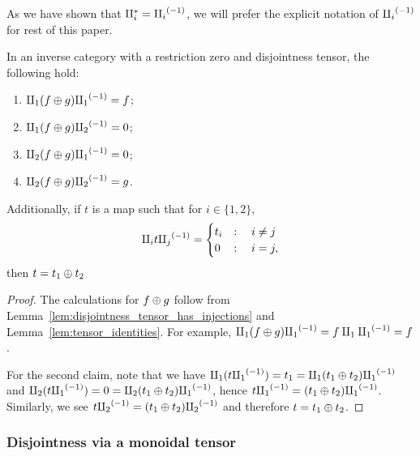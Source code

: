 As we have shown that $\amalg_{i}^{*} = {\amalg_{i}}^{(-1)}$, we will prefer the explicit notation of ${\amalg_{i}}^{(-1)}$ for
rest of this paper.

\begin{corollary}\label{cor:split_plus_tensor}
  In an inverse category \X with a restriction zero and disjointness tensor, the following hold:
  \begin{multicols}{2}
    \begin{enumerate}[{(}i{)}]
      \item $\amalg_{1} (f \oplus g) {\amalg_{1}}^{(-1)} = f$;
      \item $\amalg_{1} (f\oplus g) {\amalg_{2}}^{(-1)} = 0$;
      \item $\amalg_{2} (f \oplus g) {\amalg_{1}}^{(-1)} = 0$;
      \item $\amalg_{2} (f\oplus g) {\amalg_{2}}^{(-1)} = g$.
    \end{enumerate}
  \end{multicols}
  Additionally, if $t$ is a map such that for $i \in \{1,2\}$,
  \[
    \amalg_{i} t {\amalg_{j}}^{(-1)} =
    \begin{cases}
      t_i& : \quad i \neq j\\
      0 & : \quad i = j,
    \end{cases}
  \]
  then $t = t_1 \oplus t_2$
\end{corollary}
\begin{proof}
  The calculations for $f\oplus g$ follow from Lemma~\ref{lem:disjointness_tensor_has_injections} and
  Lemma~\ref{lem:tensor_identities}. For example, $\amalg_{1} (f\oplus g) {\amalg_{1}}^{(-1)} = f \amalg_{1} {\amalg_{1}}^{(-1)} = f$.

  For the second claim, note that we have $\amalg_{1} (t {\amalg_{1}}^{(-1)}) = t_1 = \amalg_{1} ( t_1 \oplus t_2){\amalg_{1}}^{(-1)}$ and
  $\amalg_{2}  (t {\amalg_{1}}^{(-1)}) = 0 = \amalg_{2} ( t_1 \oplus t_2){\amalg_{1}}^{(-1)}$, hence $t {\amalg_{1}}^{(-1)} = ( t_1 \oplus t_2){\amalg_{1}}^{(-1)}$. Similarly,
  we see $t{\amalg_{2}}^{(-1)} = ( t_1 \oplus t_2){\amalg_{2}}^{(-1)}$ and therefore $t = t_1 \oplus t_2$.
\end{proof}
\subsubsection{Disjointness via a monoidal tensor} %
\label{ssub:disjointess_via_a_monoidal_tensor}

